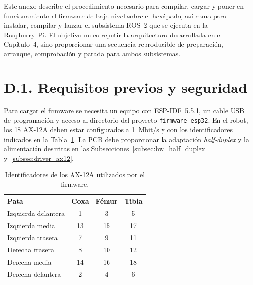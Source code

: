 \setcounter{table}{0}
\renewcommand{\thetable}{D.\arabic{table}}
\renewcommand{\theHtable}{D.\arabic{table}}

Este anexo describe el procedimiento necesario para compilar, cargar y poner en
funcionamiento el firmware de bajo nivel sobre el hexápodo, así como para instalar,
compilar y lanzar el subsistema ROS~2 que se ejecuta en la Raspberry~Pi. El objetivo
no es repetir la arquitectura desarrollada en el Capítulo~4, sino proporcionar una
secuencia reproducible de preparación, arranque, comprobación y parada para ambos
subsistemas.

\section*{D.1. Requisitos previos y seguridad}

Para cargar el firmware se necesita un equipo con ESP-IDF~5.5.1, un cable USB
de programación y acceso al directorio del proyecto \texttt{firmware\_esp32}. En el
robot, los 18 AX-12A deben estar configurados a 1~Mbit/s y con los
identificadores indicados en la Tabla~\ref{tab:manual_ids_servos}. La PCB debe
proporcionar la adaptación \textit{half-duplex} y la alimentación descritas en
las Subsecciones~\ref{subsec:hw_half_duplex} y~\ref{subsec:driver_ax12}.

\noindent{}

\begin{table}[H]
    \centering
    \small
    \begin{tabularx}{\textwidth}{@{}Xccc@{}}
        \toprule
        \textbf{Pata} & \textbf{Coxa} & \textbf{Fémur} & \textbf{Tibia} \\
        \midrule
        Izquierda delantera & 1  & 3  & 5  \\
        Izquierda media     & 13 & 15 & 17 \\
        Izquierda trasera   & 7  & 9  & 11 \\
        Derecha trasera     & 8  & 10 & 12 \\
        Derecha media       & 14 & 16 & 18 \\
        Derecha delantera   & 2  & 4  & 6  \\
        \bottomrule
    \end{tabularx}
    \caption{Identificadores de los AX-12A utilizados por el firmware.}
    \label{tab:manual_ids_servos}
\end{table}

